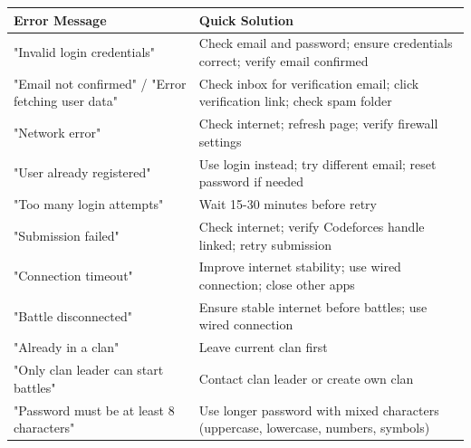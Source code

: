 \documentclass[12pt,a4paper]{article}
\begin{document}
\begin{longtable}{|p{6cm}|p{8cm}|}
\hline
\textbf{Error Message} & \textbf{Quick Solution} \\
\hline
\endhead

"Invalid login credentials" & Check email and password; ensure credentials correct; verify email confirmed \\
\hline

"Email not confirmed" / "Error fetching user data" & Check inbox for verification email; click verification link; check spam folder \\
\hline

"Network error" & Check internet; refresh page; verify firewall settings \\
\hline

"User already registered" & Use login instead; try different email; reset password if needed \\
\hline

"Too many login attempts" & Wait 15-30 minutes before retry \\
\hline

"Submission failed" & Check internet; verify Codeforces handle linked; retry submission \\
\hline

"Connection timeout" & Improve internet stability; use wired connection; close other apps \\
\hline

"Battle disconnected" & Ensure stable internet before battles; use wired connection \\
\hline

"Already in a clan" & Leave current clan first \\
\hline

"Only clan leader can start battles" & Contact clan leader or create own clan \\
\hline

"Password must be at least 8 characters" & Use longer password with mixed characters (uppercase, lowercase, numbers, symbols) \\
\hline

\end{longtable}



\FloatBarrier

\end{document}
